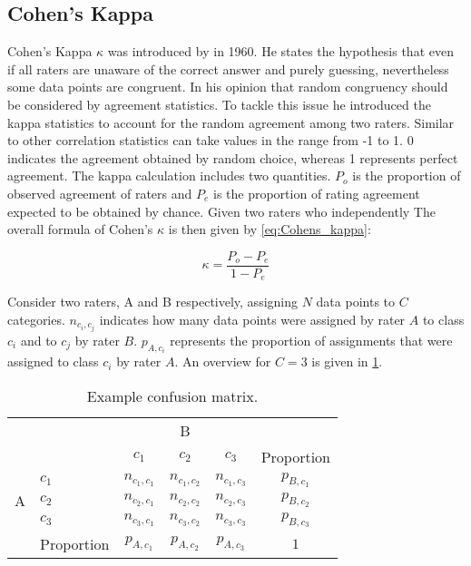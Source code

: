\subsection{Cohen's Kappa}
\label{chp:fundamentals:sec:inter_rater_agreement:subsec:cohens_kappa}
Cohen's Kappa $\kappa$ was introduced by \textcite{Cohen:1960} in 1960.
He states the hypothesis that even if all raters are unaware of the correct answer and purely guessing, nevertheless some data points are congruent.
In his opinion that random congruency should be considered by agreement statistics.
To tackle this issue he introduced the kappa statistics to account for the random agreement among two raters.
Similar to other correlation statistics can take values in the range from -1 to 1.
0 indicates the agreement obtained by random choice, whereas 1 represents perfect agreement.
The kappa calculation includes two quantities.
$P_o$ is the proportion of observed agreement of raters and $P_e$ is the proportion of rating agreement expected to be obtained by chance.
Given two raters who independently
The overall formula of Cohen's $\kappa$ is then given by \cref{eq:Cohens_kappa}:

\begin{equation}\label{eq:Cohens_kappa}
    \kappa = \frac{P_o - P_e}{1 - P_e}
\end{equation}

Consider two raters, A and B respectively, assigning $N$ data points to $C$ categories.
$n_{c_i, c_j}$ indicates how many data points were assigned by rater $A$ to class $c_i$ and to $c_j$ by rater $B$.
$p_{A, c_i}$ represents the proportion of assignments that were assigned to class $c_i$ by rater $A$.
An overview for $C=3$ is given in \cref{tab:cohens_kappa_sample_definition}.

\begin{table}[htpb]
    \centering
    \begin{tabular}{l|l|c|c|c|c}
        \multicolumn{2}{c}{}&\multicolumn{3}{c}{B}&\\
        \cline{3-5}
        \multicolumn{2}{c|}{}&$c_1$&$c_2$&$c_3$&\multicolumn{1}{c}{Proportion}\\
        \cline{2-5}
        \multirow{3}{*}{A}& $c_1$ & $n_{c_1, c_1}$ & $n_{c_1, c_2}$ &$n_{c_1, c_3}$& $p_{B, c_1}$\\
        \cline{2-5}
        & $c_2$ & $n_{c_2, c_1}$ & $n_{c_2, c_2}$ &$n_{c_2, c_3}$&$p_{B, c_2}$\\
        \cline{2-5}
        & $c_3$ & $n_{c_3, c_1}$ & $n_{c_3, c_2}$ &$n_{c_3, c_3}$ & $p_{B, c_3}$\\
        \cline{2-5}
        \multicolumn{1}{c}{} & \multicolumn{1}{c}{Proportion} & \multicolumn{1}{c}{$p_{A, c_1}$} & \multicolumn{1}{c}{$p_{A, c_2}$} & \multicolumn{1}{c}{$p_{A, c_3}$} & \multicolumn{1}{c}{$1$}\\
    \end{tabular}
    \caption[Cohen's Kappa notation overview]{Example confusion matrix.}\label{tab:cohens_kappa_sample_definition}
\end{table}

